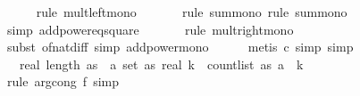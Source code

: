 \begin{isabellebody}
\ \ \ \ \isamarkupfalse%
\ {\isacharparenleft}{\kern0pt}rule\ mult{\isacharunderscore}{\kern0pt}left{\isacharunderscore}{\kern0pt}mono{\isacharparenright}{\kern0pt}\isanewline
\ \ \ \ \ \isamarkupfalse%
\ {\isacharparenleft}{\kern0pt}rule\ sum{\isacharunderscore}{\kern0pt}mono{\isacharcomma}{\kern0pt}\ rule\ sum{\isacharunderscore}{\kern0pt}mono{\isacharparenright}{\kern0pt}\isanewline
\ \ \ \ \ \isamarkupfalse%
\ {\isacharparenleft}{\kern0pt}simp\ add{\isacharcolon}{\kern0pt}power{}{\isacharunderscore}{\kern0pt}eq{\isacharunderscore}{\kern0pt}square{\isacharparenright}{\kern0pt}\isanewline
\ \ \ \ \ \isamarkupfalse%
\ {\isacharparenleft}{\kern0pt}rule\ mult{\isacharunderscore}{\kern0pt}right{\isacharunderscore}{\kern0pt}mono{\isacharparenright}{\kern0pt}\isanewline
\ \ \ \ \ \ \isamarkupfalse%
\ {\isacharparenleft}{\kern0pt}subst\ of{\isacharunderscore}{\kern0pt}nat{\isacharunderscore}{\kern0pt}diff{\isacharcomma}{\kern0pt}\ simp\ add{\isacharcolon}{\kern0pt}power{\isacharunderscore}{\kern0pt}mono{\isacharparenright}{\kern0pt}\isanewline
\ \ \ \ \isamarkupfalse%
\ {\isacharparenleft}{\kern0pt}metis\ c{\isacharcomma}{\kern0pt}\ simp{\isacharcomma}{\kern0pt}\ simp{\isacharparenright}{\kern0pt}\isanewline
\ \ \isamarkupfalse%
\ \isamarkupfalse%
\ {\isachardoublequoteopen}{\isachardot}{\kern0pt}{\isachardot}{\kern0pt}{\isachardot}{\kern0pt}\ {\isacharequal}{\kern0pt}\ real\ {\isacharparenleft}{\kern0pt}length\ as{\isacharparenright}{\kern0pt}\ {\isacharasterisk}{\kern0pt}\ {\isacharparenleft}{\kern0pt}{\isasymSum}a{\isasymin}\ set\ as{\isachardot}{\kern0pt}\ real\ {\isacharparenleft}{\kern0pt}k\ {\isacharasterisk}{\kern0pt}\ count{\isacharunderscore}{\kern0pt}list\ as\ a\ {\isacharcircum}{\kern0pt}\ {\isacharparenleft}{\kern0pt}{}{\isacharasterisk}{\kern0pt}k{\isacharminus}{\kern0pt}{}{\isacharparenright}{\kern0pt}{\isacharparenright}{\kern0pt}{\isacharparenright}{\kern0pt}{\isachardoublequoteclose}\isanewline
\ \ \ \ \isamarkupfalse%
\ {\isacharparenleft}{\kern0pt}rule\ arg{\isacharunderscore}{\kern0pt}cong{}{\isacharbrackleft}{\kern0pt}\ f{\isacharequal}{\kern0pt}{\isachardoublequoteopen}{\isacharparenleft}{\kern0pt}{\isacharasterisk}{\kern0pt}{\isacharparenright}{\kern0pt}{\isachardoublequoteclose}{\isacharbrackright}{\kern0pt}{\isacharcomma}{\kern0pt}\ simp{\isacharparenright}{\kern0pt}\isanewline
\ \ \ \ \isamarkupfalse%

\end{isabellebody}
